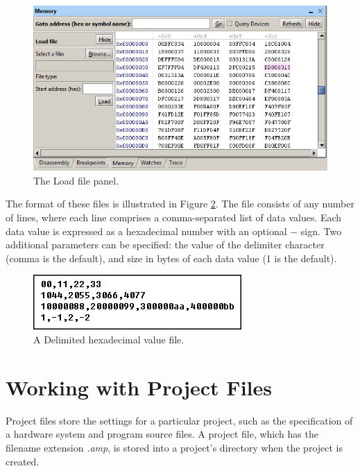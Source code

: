 \documentclass[11pt, twoside, pdftex]{article}
\begin{document}
\begin{figure}[H]
   \begin{center}
      \includegraphics[scale=0.7]{screenshots/figure43.png}
   \end{center}
   \caption{The Load file panel.}
   \label{fig:AMP_memoryload}
\end{figure}

The format of these files is illustrated in Figure \ref{fig:example_delimited_hex_file}. 
The file consists of any number of lines, where each line
comprises a comma-separated list of data values. Each data value
is expressed as a hexadecimal number with an optional $-$ sign.
Two additional parameters can be specified: the value of the
delimiter character (comma is the default), and size in bytes of
each data value (1 is the default).

\begin{figure}[H]
   \begin{center}
      \includegraphics[scale=0.80]{screenshots/figure44.png}
   \end{center}
   \caption{A Delimited hexadecimal value file.}
   \label{fig:example_delimited_hex_file}
\end{figure}


\section{Working with Project Files}

Project files store the settings for a particular project, 
such as the specification of a hardware system and program source
files. A project file, which has the filename 
extension {\it .amp}, is stored into a project's directory when
the project is created. 
\end{document}
